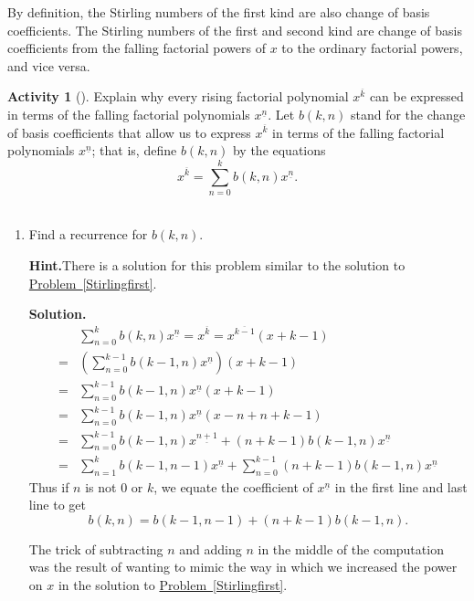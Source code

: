 \documentclass[10pt,]{book}
\theoremstyle{plain}
\theoremstyle{definition}
\newtheorem{activity}[project]{Activity}
\numberwithin{equation}{chapter}
\newcommand{\amp}{&}
\begin{document}
By definition, the Stirling numbers of the first kind are also change of basis coefficients. The Stirling numbers of the first and second kind are change of basis coefficients from the falling factorial powers of \(x\) to the ordinary factorial powers, and vice versa.%
\begin{activity}[]\label{activity-146}
Explain why every rising factorial polynomial \(x^{\overline{k}}\) can be expressed in terms of the falling factorial polynomials \(x^{\underline{n}}\). Let \(b(k,n)\) stand for the change of basis coefficients that allow us to express \(x^{\overline{k}}\) in terms of the falling factorial polynomials \(x^{\underline{n}}\); that is, define \(b(k,n)\) by the equations%
\begin{equation*}
x^{\overline{k}}=\sum_{n=0}^k b(k,n) x^{\underline{n}}.
\end{equation*}
%
~\par
\begin{enumerate}[label=(\alph*)]
 \item Find a recurrence for \(b(k,n)\).%
\par\medskip\noindent%
\textbf{Hint.}\quad There is a solution for this problem similar to the solution to \hyperref[Stirlingfirst]{Problem~\ref{Stirlingfirst}}.%
\par\medskip\noindent%
\textbf{Solution.}\quad %
\begin{align*}
\amp \sum_{n=0}^k b(k,n) x^{\underline{n}} = x^{\overline{k}} =
x^{\overline{k-1}}(x+k-1)\\
=\amp \left(\sum_{n=0}^{k-1} b(k-1,n) x^{\underline{n}}\right)(x+k-1)\\
=\amp \sum_{n=0}^{k-1} b(k-1,n) x^{\underline{n}}(x+k-1)\\
=\amp \sum_{n=0}^{k-1} b(k-1,n) x^{\underline{n}}(x-n+n+k-1)\\
=\amp \sum_{n=0}^{k-1} b(k-1,n) x^{\underline{n+1}} +(n+k-1)b(k-1,n)
x^{\underline{n}}\\
=\amp \sum_{n=1}^k b(k-1,n-1)x^{\underline{n}} +\sum_{n=0}^{k-1}
(n+k-1)b(k-1,n)x^{\underline{n}}
\end{align*}
Thus if \(n\) is not 0 or \(k\), we equate the coefficient of \(x^{\underline{n}}\) in the first line and last line to get%
\begin{equation*}
b(k,n) =
b(k-1,n-1) + (n+k-1)b(k-1,n).
\end{equation*}
%
\par
The trick of subtracting \(n\) and adding \(n\) in the middle of the computation was the result of wanting to mimic the way in which we increased the power on \(x\) in the solution to \hyperref[Stirlingfirst]{Problem~\ref{Stirlingfirst}}.%


\end{enumerate}
\end{activity}
\end{document}
